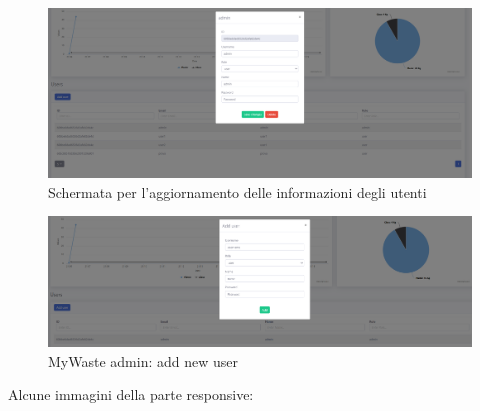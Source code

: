 \documentclass{report}
\begin{document}
\begin{figure}[h!]
    \begin{center}
        \includegraphics[width=1.0\textwidth]{images/updateUserData.PNG}  \end{center}
    \caption{Schermata per l'aggiornamento delle informazioni degli utenti}
    \label{fig:userUpdate}
\end{figure}
\begin{figure}[h!]
    \begin{center}
        \includegraphics[width=1.0\textwidth]{images/addNewUser.PNG}  \end{center}
    \caption{MyWaste admin: add new user}
    \label{fig:addNewUser}
\end{figure}
Alcune immagini della parte responsive:
\end{document}
